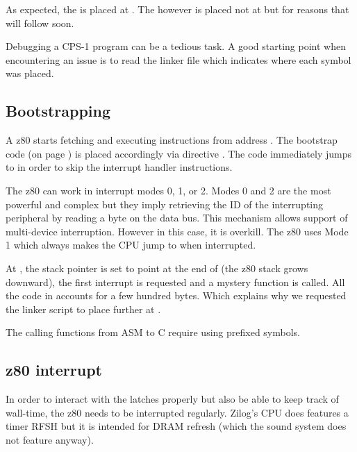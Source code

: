 

As expected, the  is placed at . The  however is placed not at  but  for reasons that will follow soon.

\begin{trivia}
Debugging a CPS-1 program can be a tedious task. A good starting point when encountering an issue is to read the linker  file which indicates where each symbol was placed.
\end{trivia}

\subsection{Bootstrapping}
A z80 starts fetching and executing instructions from address . The bootstrap code  (on page \pageref{z80_crt0}) is placed accordingly via directive . The code immediately jumps to  in order to skip the interrupt handler instructions. 

The z80 can work in interrupt modes 0, 1, or 2. Modes 0 and 2 are the most powerful and complex but they imply retrieving the ID of the interrupting peripheral by reading a byte on the data bus. This mechanism allows support of multi-device interruption. However in this case, it is overkill. The z80 uses Mode 1 which always makes the CPU jump to  when interrupted.

At , the stack pointer  is set to point at the end of  (the z80 stack grows downward), the first interrupt is requested and a mystery  function is called. All the code in  accounts for a few hundred bytes. Which explains why we requested the linker script to place  further at .

\begin{trivia}
The calling functions from ASM to C require using \icode{\_} prefixed symbols.
\end{trivia}
\pagebreak


\label{z80_crt0}







\subsection{z80 interrupt}
In order to interact with the latches properly but also be able to keep track of wall-time, the z80 needs to be interrupted regularly. Zilog's CPU does features a timer RFSH but it is intended for DRAM refresh (which the sound system does not feature anyway).

